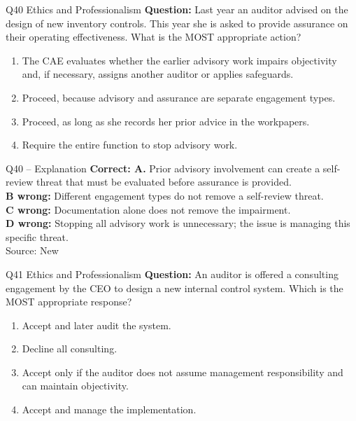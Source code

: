 \documentclass[aspectratio=169,10pt]{beamer}
\begin{document}
\begin{frame}[t]{Q40 \hfill {\scriptsize Ethics and Professionalism}}
	\small
	\textbf{Question:} Last year an auditor advised on the design of new inventory controls. This year she is asked to provide assurance on their operating effectiveness. What is the MOST appropriate action?
	\begin{enumerate}[label=\Alph*.,itemsep=1pt,topsep=3pt]
			\item The CAE evaluates whether the earlier advisory work impairs objectivity and, if necessary, assigns another auditor or applies safeguards.
			\item Proceed, because advisory and assurance are separate engagement types.
			\item Proceed, as long as she records her prior advice in the workpapers.
			\item Require the entire function to stop advisory work.
	\end{enumerate}
\end{frame}

\begin{frame}[t]{Q40 -- Explanation}
	\footnotesize
	\textbf{Correct: A.} Prior advisory involvement can create a self-review threat that must be evaluated before assurance is provided. \\[5pt]
\textbf{B wrong:} Different engagement types do not remove a self-review threat. \\[3pt]
\textbf{C wrong:} Documentation alone does not remove the impairment. \\[3pt]
\textbf{D wrong:} Stopping all advisory work is unnecessary; the issue is managing this specific threat. \\[3pt]
	\vfill {\tiny Source: New}
\end{frame}

\begin{frame}[t]{Q41 \hfill {\scriptsize Ethics and Professionalism}}
	\small
	\textbf{Question:} An auditor is offered a consulting engagement by the CEO to design a new internal control system. Which is the MOST appropriate response?
	\begin{enumerate}[label=\Alph*.,itemsep=1pt,topsep=3pt]
			\item Accept and later audit the system.
			\item Decline all consulting.
			\item Accept only if the auditor does not assume management responsibility and can maintain objectivity.
			\item Accept and manage the implementation.
	\end{enumerate}
\end{frame}
\end{document}
